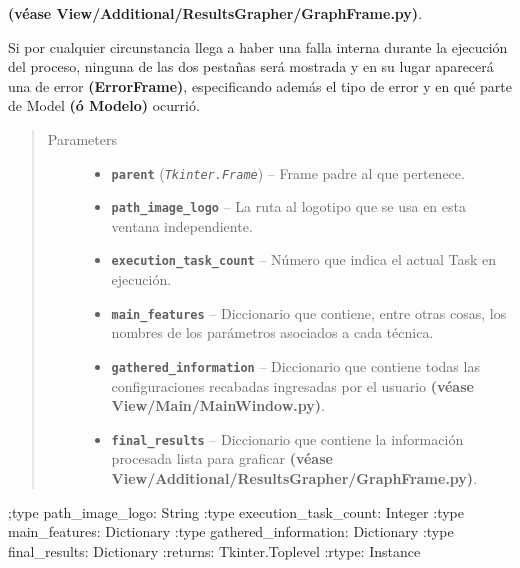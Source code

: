 \documentclass[letterpaper,10pt,english]{sphinxmanual}
\begin{document}
\begin{fulllineitems}
\begin{DUlineblock}{0em}
\textbf{(véase View/Additional/ResultsGrapher/GraphFrame.py)}.
\item[] 
\item[] Si por cualquier circunstancia llega a haber una falla interna durante la ejecución del proceso, ninguna de las dos
pestañas será mostrada y en su lugar aparecerá una de error \textbf{(ErrorFrame)}, especificando además el tipo de error
y en qué parte de Model \textbf{(ó Modelo)} ocurrió.
\end{DUlineblock}
\begin{quote}\begin{description}
\item[{Parameters}] \leavevmode\begin{itemize}
\item {} 
\textbf{\texttt{parent}} (\emph{\texttt{Tkinter.Frame}}) -- Frame padre al que pertenece.

\item {} 
\textbf{\texttt{path\_image\_logo}} -- La ruta al logotipo que se usa en esta ventana independiente.

\item {} 
\textbf{\texttt{execution\_task\_count}} -- Número que indica el actual Task en ejecución.

\item {} 
\textbf{\texttt{main\_features}} -- Diccionario que contiene, entre otras cosas, los nombres de los
parámetros asociados a cada técnica.

\item {} 
\textbf{\texttt{gathered\_information}} -- Diccionario que contiene todas las configuraciones 
recabadas ingresadas por el usuario \textbf{(véase View/Main/MainWindow.py)}.

\item {} 
\textbf{\texttt{final\_results}} -- Diccionario que contiene la información procesada lista para graficar
\textbf{(véase View/Additional/ResultsGrapher/GraphFrame.py)}.

\end{itemize}

\end{description}\end{quote}

;type path\_image\_logo: String
:type execution\_task\_count: Integer
:type main\_features: Dictionary
:type gathered\_information: Dictionary
:type final\_results: Dictionary
:returns: Tkinter.Toplevel
:rtype: Instance


\end{fulllineitems}
\end{document}
